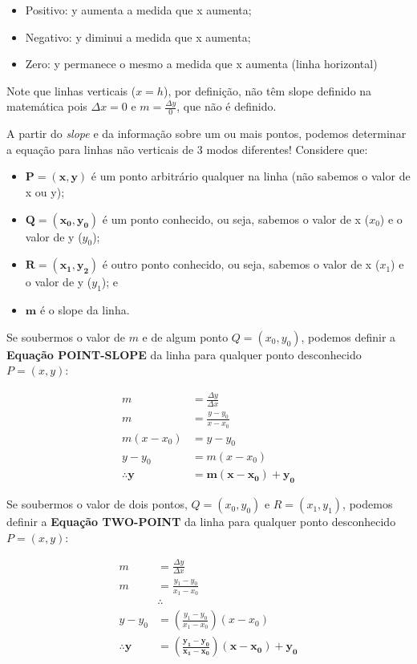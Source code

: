\documentclass[pdftex, brazil, 12pt, twoside]{article}
\begin{document}
\begin{itemize}[noitemsep]
\item Positivo: y aumenta a medida que x aumenta;
\item Negativo: y diminui a medida que x aumenta;
\item Zero: y permanece o mesmo a medida que x aumenta (linha horizontal)
\end{itemize}

Note que linhas verticais ($x = h$), por definição, não têm slope definido na matemática pois
$\Delta x = 0$ e $m = \frac{\Delta y}{0}$, que não é definido.

A partir do \emph{slope} e da informação sobre um ou mais pontos,
podemos determinar a equação para linhas não verticais de 3 modos diferentes! Considere que:

\begin{itemize}
\item $\bm{P=(x,y)}$ é um ponto arbitrário qualquer na linha (não sabemos o valor de x ou y);
\item $\bm{Q=(x_0, y_0)}$ é um ponto conhecido, ou seja, sabemos o valor de x ($x_0$) e o valor de y ($y_0$);
\item $\bm{R=(x_1,y_2)}$ é outro ponto conhecido, ou seja, sabemos o valor de x ($x_1$) e o valor de y ($y_1$); e
\item $\bm{m}$ é o slope da linha.
\end{itemize}

Se soubermos o valor de $m$ e de algum ponto $Q=(x_0, y_0)$, podemos definir a
\textbf{Equação POINT-SLOPE} da linha para qualquer ponto desconhecido $P=(x,y)$:

\begin{equation}
  \begin{split}
    m & = \frac{\Delta y}{\Delta x}\\
    m & = \frac{y - y_0}{x - x_0}\\
    m(x - x_0) & = y - y_0\\
    y - y_0 & = m(x - x_0)\\
    \bm{\therefore y} & \bm{= m(x-x_0) + y_0}
  \end{split}
\end{equation}

Se soubermos o valor de dois pontos, $Q=(x_0, y_0)$ e $R=(x_1, y_1)$, podemos definir
a \textbf{Equação TWO-POINT} da linha para qualquer ponto desconhecido $P=(x, y)$:

\begin{equation}
  \begin{split}
    m & = \frac{\Delta y}{\Delta x}\\
    m & = \frac{y_1 - y_0}{x_1 - x_0}\\
      & \therefore\\
    y - y_0 & = \left(\frac{y_1 - y_0}{x_1 - x_0}\right)(x - x_0)\\
    \bm{\therefore y} & \bm{= \left(\frac{y_1 - y_0}{x_1 - x_0}\right)(x-x_0) + y_0}
  \end{split}
\end{equation}
\end{document}
